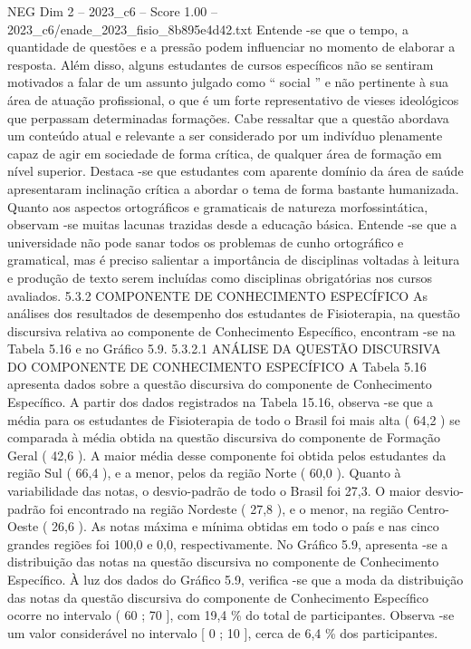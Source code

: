 \begin{textsample}{NEG Dim 2 – 2023\_c6 – Score 1.00 – 2023\_c6/enade\_2023\_fisio\_8b895e4d42.txt}
Entende -se que o tempo, a quantidade de questões e a pressão podem influenciar no momento de elaborar a resposta.
Além disso, alguns estudantes de cursos específicos não se sentiram motivados a falar de um assunto julgado como “ social ” e não pertinente à sua área de atuação profissional, o que é um forte representativo de vieses ideológicos que perpassam determinadas formações.
Cabe ressaltar que a questão abordava um conteúdo atual e relevante a ser considerado por um indivíduo plenamente capaz de agir em sociedade de forma crítica, de qualquer área de formação em nível superior.
Destaca -se que estudantes com aparente domínio da área de saúde apresentaram inclinação crítica a abordar o tema de forma bastante humanizada.
Quanto aos aspectos ortográficos e gramaticais de natureza morfossintática, observam -se muitas lacunas trazidas desde a educação básica.
Entende -se que a universidade não pode sanar todos os problemas de cunho ortográfico e gramatical, mas é preciso salientar a importância de disciplinas voltadas à leitura e produção de texto serem incluídas como disciplinas obrigatórias nos cursos avaliados. 5.3.2 COMPONENTE DE CONHECIMENTO ESPECÍFICO As análises dos resultados de desempenho dos estudantes de Fisioterapia, na questão discursiva relativa ao componente de Conhecimento Específico, encontram -se na Tabela 5.16 e no Gráfico 5.9. 5.3.2.1 ANÁLISE DA QUESTÃO DISCURSIVA DO COMPONENTE DE CONHECIMENTO ESPECÍFICO A Tabela 5.16 apresenta dados sobre a questão discursiva do componente de Conhecimento Específico.
A partir dos dados registrados na Tabela 15.16, observa -se que a média para os estudantes de Fisioterapia de todo o Brasil foi mais alta ( 64,2 ) se comparada à média obtida na questão discursiva do componente de Formação Geral ( 42,6 ).
A maior média desse componente foi obtida pelos estudantes da região Sul ( 66,4 ), e a menor, pelos da região Norte ( 60,0 ).
Quanto à variabilidade das notas, o desvio-padrão de todo o Brasil foi 27,3.
O maior desvio-padrão foi encontrado na região Nordeste ( 27,8 ), e o menor, na região Centro-Oeste ( 26,6 ).
As notas máxima e mínima obtidas em todo o país e nas cinco grandes regiões foi 100,0 e 0,0, respectivamente.
No Gráfico 5.9, apresenta -se a distribuição das notas na questão discursiva no componente de Conhecimento Específico.
À luz dos dados do Gráfico 5.9, verifica -se que a moda da distribuição das notas da questão discursiva do componente de Conhecimento Específico ocorre no intervalo ( 60 ; 70 ], com 19,4 \% do total de participantes.
Observa -se um valor considerável no intervalo [ 0 ; 10 ], cerca de 6,4 \% dos participantes.

\end{textsample}
